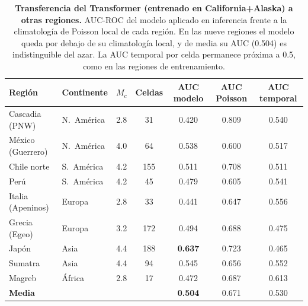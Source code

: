 \begin{table}[ht!]
  \centering
  \small
  \begin{tabular}{@{}llccccc@{}}
    \toprule
    \textbf{Región}   & \textbf{Continente} & \textbf{$M_c$} & \textbf{Celdas} & \textbf{AUC modelo} & \textbf{AUC Poisson} & \textbf{AUC temporal} \\
    \midrule
    Cascadia (PNW)    & N.\ América         & 2.8            & 31              & 0.420               & 0.809                & 0.540                 \\
    México (Guerrero) & N.\ América         & 4.0            & 64              & 0.538               & 0.600                & 0.517                 \\
    Chile norte       & S.\ América         & 4.2            & 155             & 0.511               & 0.708                & 0.511                 \\
    Perú              & S.\ América         & 4.2            & 45              & 0.479               & 0.605                & 0.541                 \\
    Italia (Apeninos) & Europa              & 2.8            & 33              & 0.441               & 0.647                & 0.556                 \\
    Grecia (Egeo)     & Europa              & 3.2            & 172             & 0.494               & 0.688                & 0.475                 \\
    Japón             & Asia                & 4.4            & 188             & \textbf{0.637}      & 0.723                & 0.465                 \\
    Sumatra           & Asia                & 4.4            & 94              & 0.545               & 0.656                & 0.552                 \\
    Magreb            & África              & 2.8            & 17              & 0.472               & 0.687                & 0.613                 \\
    \midrule
    \textbf{Media}    &                     &                &                 & \textbf{0.504}      & 0.671                & 0.530                 \\
    \bottomrule
  \end{tabular}
  \caption[Transferencia del Transformer a otras regiones]{\textbf{Transferencia del Transformer (entrenado en California+Alaska) a otras regiones.} AUC-ROC del modelo aplicado en inferencia frente a la climatología de Poisson local de cada región. En las nueve regiones el modelo queda por debajo de su climatología local, y de media su AUC (0.504) es indistinguible del azar. La AUC temporal por celda permanece próxima a 0.5, como en las regiones de entrenamiento.}
  \label{tab:transferencia}
\end{table}

